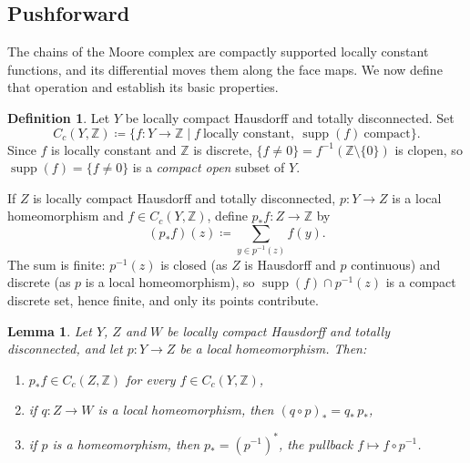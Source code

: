 \documentclass{extracta-temp-26}
\makeatletter
\numberwithin{equation}{section}
\newtheorem{lem}[teo]{Lemma}
\theoremstyle{definition}
\newtheorem{defi}[teo]{Definition}
\theoremstyle{remark}
\newcommand{\Z}{\mathbb{Z}}
\DeclareMathOperator{\supp}{supp}
\newcommand{\keepwithnext}{\leavevmode\par\nobreak\@afterheading}
\newcommand{\subhead}[1]{\subsection*{#1}\keepwithnext}
\makeatother
\begin{document}
\subhead{Pushforward}
The chains of the Moore complex are compactly supported locally constant functions, and its differential moves them along the face maps.
We now define that operation and establish its basic properties.

\begin{defi}\label{def:Cc}
Let \(Y\) be locally compact Hausdorff and totally disconnected.
Set
\begin{equation}\label{eq:Cc}
C_c(Y,\Z)\coloneqq\{f\colon Y\to\Z\mid f\ \text{locally constant},\ \supp(f)\ \text{compact}\}.
\end{equation}
Since \(f\) is locally constant and \(\Z\) is discrete, \(\{f\neq0\}=f^{-1}(\Z\setminus\{0\})\) is clopen, so \(\supp(f)=\{f\neq0\}\) is a \emph{compact open} subset of \(Y\).

If \(Z\) is locally compact Hausdorff and totally disconnected, \(p\colon Y\to Z\) is a local homeomorphism and \(f\in C_c(Y,\Z)\), define \(p_*f\colon Z\to\Z\) by
\begin{equation}\label{eq:pushforward}
(p_*f)(z)\coloneqq\sum_{y\in p^{-1}(z)}f(y).
\end{equation}
The sum is finite: \(p^{-1}(z)\) is closed (as \(Z\) is Hausdorff and \(p\) continuous) and discrete (as \(p\) is a local homeomorphism), so \(\supp(f)\cap p^{-1}(z)\) is a compact discrete set, hence finite, and only its points contribute.
\end{defi}

\begin{lem}\label{lem:pushforward}
Let \(Y\), \(Z\) and \(W\) be locally compact Hausdorff and totally disconnected, and let \(p\colon Y\to Z\) be a local homeomorphism. Then:
\begin{enumerate}
\item\label{it:push-cc} \(p_*f\in C_c(Z,\Z)\) for every \(f\in C_c(Y,\Z)\),
\item\label{it:push-funct} if \(q\colon Z\to W\) is a local homeomorphism, then \((q\circ p)_*=q_*\,p_*\),
\item\label{it:push-homeo} if \(p\) is a homeomorphism, then \(p_*=(p^{-1})^*\), the pullback \(f\mapsto f\circ p^{-1}\).
\end{enumerate}
\end{lem}
\end{document}
